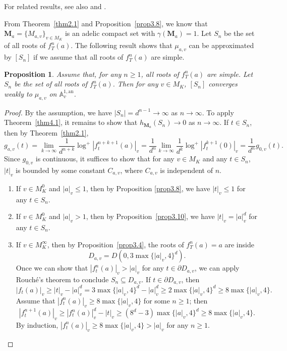 \documentclass[10pt,a4paper]{amsart}
\numberwithin{equation}{section}
\theoremstyle{plain}
\newtheorem{prop}[thm]{Proposition}
\theoremstyle{definition}
\theoremstyle{remark}
\newcommand{\A}{\mathbb A}
\newcommand{\an}{\mathrm{an}}
\begin{document}
For  related results, see also \cite{Bi,BR1,CL1,FRL} and \cite[Theorem 10.24]{BR2}.

From Theorem~\ref{thm2.1} and Proposition~\ref{prop3.8}, we know
that $\boldsymbol{M}_{a}=\{M_{a,v}\}_{v\in M_{K}}$ is an adelic compact
set with $\gamma(\boldsymbol{M}_{a})=1$. Let $S_{n}$ be the set
of all roots of $f_{T}^{n}(a)$. The following result shows that $\mu_{a,v}$
can be approximated by $[S_{n}]$ if we assume that all roots of $f_{T}^{n}(a)$
are simple.

\begin{prop}\label{prop4.2}
Assume that, for any $n\geq1$, all roots of $f_{T}^{n}(a)$
are simple. Let $S_{n}$ be the set of all roots of $f_{T}^{n}(a)$.
Then for any $v\in M_{K}$, $[S_{n}]$ converges weakly to $\mu_{a,v}$
on $\A_{v}^{1,\an}$.
\end{prop}

\begin{proof}
By the assumption, we have $|S_{n}|=d^{n-1}\to\infty$ as $n\to\infty$.
To apply Theorem~\ref{thm4.1}, it remains to show that $h_{\boldsymbol{M}_{a}}(S_{n})\to0$
as $n\to\infty$. If $t\in S_{n}$, then by Theorem~\ref{thm2.1},
\[
g_{a,v}(t)=\lim_{k\to\infty}\frac{1}{d^{n+k}}\log^{+}\left|f_{t}^{n+k+1}(a)\right|_{v}=\frac{1}{d^{n}}\lim_{k\to\infty}\frac{1}{d^{k}}\log^{+}\left|f_{t}^{k+1}(0)\right|_{v}=\frac{1}{d^{n}}g_{0,v}(t).
\]
Since $g_{0,v}$ is continuous, it suffices to show that for any $v\in M_{K}$
and any $t\in S_{n}$, $|t|_{v}$ is bounded by some constant $C_{a,v}$,
where $C_{a,v}$ is independent of $n$.
\begin{enumerate}[wide]
\item If $v\in M_{K}^{0}$ and $|a|_{v}\leq1$, then by Proposition
\ref{prop3.8}, we have $|t|_{v}\leq1$ for any $t\in S_{n}$.
\item If $v\in M_{K}^{0}$ and $|a|_{v}>1$, then by Proposition~\ref{prop3.10},
we have $|t|_{v}=|a|_{v}^{d}$ for any $t\in S_{n}$.
\item If $v\in M_{K}^{\infty}$, then by Proposition~\ref{prop3.4},
the roots of $f_{T}^{n}(a)=a$ are inside
\[
D_{a,v}=D(0,3\max\{|a|_{v},4\}^{d}).
\]
Once we can show that $|f_{t}^{n}(a)|_{v}>|a|_{v}$ for any $t\in\partial D_{a,v}$,
we can apply Rouch\'e's theorem to conclude $S_{n}\subseteq D_{a,v}$.
If $t\in\partial D_{a,v}$, then
\[
|f_{t}(a)|_{v}\geq|t|_{v}-|a|_{v}^{d}=3\max\{|a|_{v},4\}^{d}-|a|_{v}^{d}\geq2\max\{|a|_{v},4\}^{d}\geq8\max\{|a|_{v},4\}.
\]
Assume that $|f_{t}^{n}(a)|_{v}\geq8\max\{|a|_{v},4\}$ for some $n\geq1$; 
then
\[
\left|f_{t}^{n+1}(a)\right|_{v}\geq|f_{t}^{n}(a)|_{v}^{d}-|t|_{v}\geq\left(8^{d}-3\right)\max\{|a|_{v},4\}^{d}\geq8\max\{|a|_{v},4\}.
\]
By induction, $|f_{t}^{n}(a)|_{v}\geq8\max\{|a|_{v},4\}>|a|_{v}$
for any $n\geq1$.\hfill\qedhere
\end{enumerate}
\end{proof}
\end{document}
